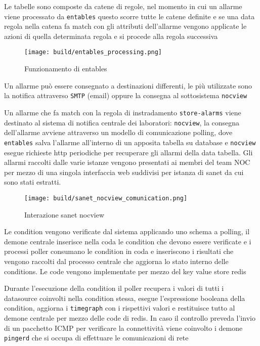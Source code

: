 Le tabelle sono composte da catene di regole, nel momento in cui un allarme viene processato da \verb|entables| questo scorre tutte le catene definite e se una data regola nella catena fa match con gli attributi dell'allarme vengono applicate le azioni di quella determinata regola e si procede alla regola successiva

\begin{figure}[H]
    \centering
    \texttt{[image: build/entables\_processing.png]}
    \caption{Funzionamento di entables}
    \label{fig:enter-label}
\end{figure}

Un allarme può essere consegnato a destinazioni differenti, le più utilizzate sono la notifica attraverso \verb|SMTP| (email) oppure la consegna al sottosistema \verb|nocview|

Un allarme che fa match con la regola di instradamento \verb|store-alarms| viene destinato al sistema di notifica centrale dei laboratori: \verb|nocview|, la consegna dell'allarme avviene attraverso un modello di comunicazione polling, dove \verb|entables| salva l'allarme all'interno di un apposita tabella su database e \verb|nocview| esegue richieste http periodiche per recuperare gli allarmi della data tabella.
Gli allarmi raccolti dalle varie istanze vengono presentati ai membri del team NOC per mezzo di una singola interfaccia web suddivisi per istanza di sanet da cui sono stati estratti.

\begin{figure}[H]
    \centering
    \texttt{[image: build/sanet\_nocview\_comunication.png]}
    \caption{Interazione sanet nocview}
    \label{fig:enter-label}
\end{figure}

Le condition vengono verificate dal sistema applicando uno schema a polling, il demone centrale inserisce nella coda le condition che devono essere verificate e i processi poller consumano le condition in coda e inseriscono i risultati che vengono raccolti dal processo centrale che aggiorna lo stato interno delle conditions. Le code vengono implementate per mezzo del key value store redis

Durante l'esecuzione della condition il poller recupera i valori di tutti i datasource coinvolti nella condition stessa, esegue l'espressione booleana della condition, aggiorna i \verb|timegraph| con i rispettivi valori e restituisce tutto al demone centrale per mezzo delle code di redis. In caso il controllo preveda l'invio di un pacchetto ICMP per verificare la connettività viene coinvolto i demone \verb|pingerd| che si occupa di effettuare le comunicazioni di rete

